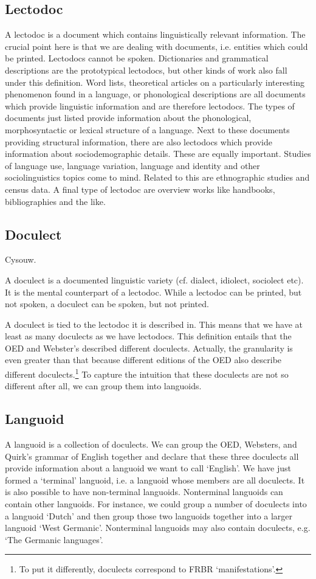 \documentclass[a4paper,10pt]{article}
\begin{document}
\subsection{Lectodoc}
A lectodoc is a document which contains linguistically relevant information. The crucial point here is that we are dealing with documents, i.e. entities which could be printed. Lectodocs cannot be spoken. Dictionaries and grammatical descriptions are the prototypical lectodocs, but other kinds of work also fall under this definition. Word lists, theoretical articles on a particularly interesting phenomenon found in a language, or phonological descriptions are all documents which provide linguistic information and are therefore lectodocs. The types of documents just listed provide information about the phonological, morphosyntactic or lexical structure of a language. Next to these documents providing structural information, there are also lectodocs which provide information about sociodemographic details. These are equally important. Studies of language use, language variation, language and identity and other sociolinguistics topics come to mind. Related to this are ethnographic studies and census data. A final type of lectodoc are overview works like handbooks, bibliographies and the like. 

\subsection{Doculect}
Cysouw. 

A doculect is a documented linguistic variety (cf. dialect, idiolect, sociolect etc). It is the mental counterpart of a lectodoc. While a lectodoc can be printed, but not spoken, a doculect can be spoken, but not printed.

A doculect is tied to the lectodoc it is described in. This means that we have at least as many doculects as we have lectodocs. This definition entails that the OED and Webster's described different doculects. Actually, the granularity is even greater than that because different editions of the OED also describe different doculects.\footnote{To put it differently, doculects correspond to FRBR `manifestations'.} To capture the intuition that these doculects are not so different after all, we can group them into languoids.

\subsection{Languoid}
A languoid is a collection of doculects. We can group the OED, Websters, and Quirk's grammar of English together and declare that these three doculects all provide information about a languoid we want to call `English'. We have just formed a `terminal' languoid, i.e. a languoid whose members are all doculects. It is also possible to have non-terminal languoids. Nonterminal languoids can contain other languoids. For instance, we could group a number of doculects into a languoid `Dutch' and then group those two languoids together into a larger languoid `West Germanic'. Nonterminal languoids may also contain doculects, e.g. `The Germanic languages'. 
\end{document}
